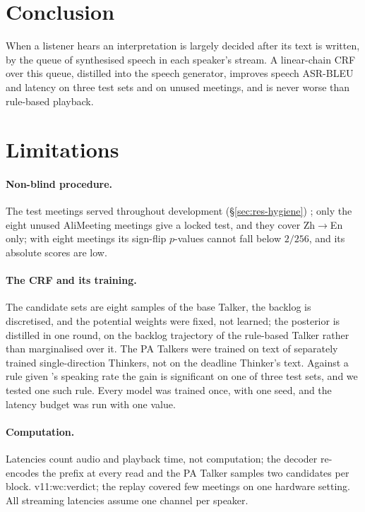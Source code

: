 \section{Conclusion}
\label{sec:conclusion}

When a listener hears an interpretation is largely decided after its text is written, by the queue of synthesised
speech in each speaker's stream. A linear-chain CRF over this queue, distilled into the speech generator, improves
speech ASR-BLEU and latency on three test sets and on unused meetings, and is never worse than rule-based playback.

\section*{Limitations}

\paragraph{Non-blind procedure.} The test meetings served throughout development (\S\ref{sec:res-hygiene})%
\ifAliEval{}; only the eight unused AliMeeting meetings give a locked test, and they cover Zh$\rightarrow$En only;
with eight meetings its sign-flip $p$-values cannot fall below $2/256$, and its absolute scores are low\fi.

\paragraph{The CRF and its training.} The candidate sets are eight samples of the base Talker, the backlog is
discretised, and the potential weights were fixed, not learned; the posterior is distilled in one round, on the backlog
trajectory of the rule-based Talker rather than marginalised over it. The PA Talkers were trained on text of separately
trained single-direction Thinkers, not on the deadline Thinker's text. Against a rule given \sys{}'s speaking rate the
gain is significant on one of three test sets, and we tested one such rule. Every model was trained once, with one
seed, and the latency budget was run with one value.

\paragraph{Computation.} Latencies count audio and playback time, not computation; the decoder re-encodes the prefix
at every read and the PA Talker samples two candidates per block.\ifWallclock{} \num{v11:wc:verdict}; the replay
covered few meetings on one hardware setting.\fi{} All streaming latencies assume one channel per speaker.

